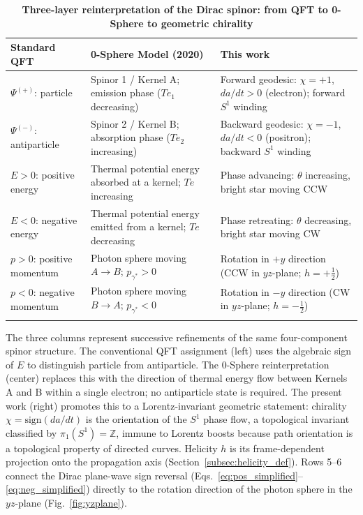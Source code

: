 \documentclass[%
 reprint, amsmath,amssymb, aps, prb, ]{revtex4-2}
\numberwithin{equation}{section}
\newcommand{\iphase}{\theta}
\begin{document}
\begin{table}[t!]
\centering
\caption{\textbf{Three-layer reinterpretation of the Dirac spinor: from QFT to 0-Sphere to geometric chirality}}
\label{tab:dirac_reinterpret}
\renewcommand{\arraystretch}{1.4}
\begin{tabular}{p{3.5cm}p{5.5cm}p{6.5cm}}
\toprule
\textbf{Standard QFT} & \textbf{0-Sphere Model \cite{hanamura07} (2020)} & \textbf{This work} \\
\midrule
$\Psi^{(+)}$: particle
& Spinor 1 / Kernel A; emission phase ($Te_1$ decreasing)
& Forward geodesic: $\chi = +1$, $da/dt > 0$ (electron); forward $S^1$ winding \\
\addlinespace[0.3cm]
$\Psi^{(-)}$: antiparticle
& Spinor 2 / Kernel B; absorption phase ($Te_2$ increasing)
& Backward geodesic: $\chi = -1$, $da/dt < 0$ (positron); backward $S^1$ winding \\
\addlinespace[0.3cm]
$E > 0$: positive energy
& Thermal potential energy absorbed at a kernel; $Te$ increasing
& Phase advancing: $\iphase$ increasing, bright star moving CCW \\
\addlinespace[0.3cm]
$E < 0$: negative energy
& Thermal potential energy emitted from a kernel; $Te$ decreasing
& Phase retreating: $\iphase$ decreasing, bright star moving CW \\
\addlinespace[0.3cm]
$p > 0$: positive momentum
& Photon sphere moving $A \to B$; $p_{\gamma^*} > 0$
& Rotation in $+y$ direction (CCW in $yz$-plane; $h = +\tfrac{1}{2}$) \\
\addlinespace[0.3cm]
$p < 0$: negative momentum
& Photon sphere moving $B \to A$; $p_{\gamma^*} < 0$
& Rotation in $-y$ direction (CW in $yz$-plane; $h = -\tfrac{1}{2}$) \\
\addlinespace[0.2cm]
\bottomrule
\end{tabular}
\vspace{0.2cm}
\begin{minipage}{0.95\textwidth}
\justifying\footnotesize
The three columns represent successive refinements of the same four-component spinor structure. The conventional QFT assignment (left) uses the algebraic sign of $E$ to distinguish particle from antiparticle. The 0-Sphere reinterpretation~\cite{hanamura07} (center) replaces this with the direction of thermal energy flow between Kernels A and B within a single electron; no antiparticle state is required. The present work (right) promotes this to a Lorentz-invariant geometric statement: chirality $\chi = \mathrm{sign}(da/dt)$ is the orientation of the $S^1$ phase flow, a topological invariant classified by $\pi_1(S^1)=\mathbb{Z}$, immune to Lorentz boosts because path orientation is a topological property of directed curves. Helicity $h$ is its frame-dependent projection onto the propagation axis (Section~\ref{subsec:helicity_def}). Rows 5--6 connect the Dirac plane-wave sign reversal (Eqs.~\eqref{eq:pos_simplified}--\eqref{eq:neg_simplified}) directly to the rotation direction of the photon sphere in the $yz$-plane (Fig.~\ref{fig:yzplane}).
\end{minipage}
\end{table}
\end{document}
